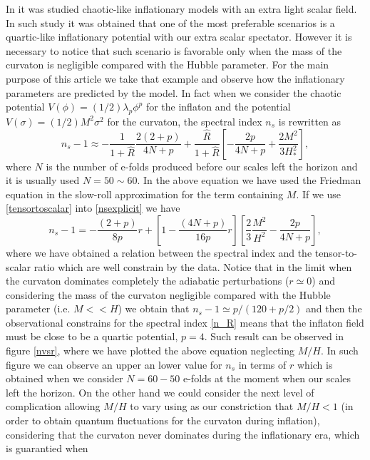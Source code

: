\documentclass[amssymb,twocolumn,prd,nofootinbib,showpacs]{revtex4-1}
\begin{document}
In \cite{curvaton15} it was studied chaotic-like inflationary models with an extra light scalar field. In such study it was obtained that one of the most preferable scenarios is a quartic-like inflationary potential with our extra scalar spectator. However it is necessary to notice that such scenario is favorable only when the mass of the curvaton is negligible compared with the Hubble parameter. For the main purpose of this article we take that example and observe how the inflationary parameters are predicted by the model. In fact when we consider the chaotic potential $V(\phi)=(1/2)\lambda_p\phi^p$ for the inflaton and the  potential $V(\sigma)= (1/2)M^2\sigma^2$ for the curvaton, the spectral index $n_s$ is rewritten as
\begin{equation}
\label{nsexplicit}
n_s-1\approx -\frac{1}{1+\hat R}\frac{2(2+p)}{4N+p}+\frac{\hat R}{1+\hat R}\left[-\frac{2p}{4N+p}+\frac{2M^2}{3H_*^2}\right],
\end{equation}
where  $N$ is the number of e-folds produced before our scales left the horizon and it is usually used $N=50\sim 60$. In the above equation we have used the Friedman equation in the slow-roll approximation for the term containing $M$. If we use \eqref{tensortoscalar} into \eqref{nsexplicit} we have 
\begin{equation}
n_s-1=-\frac{(2+p)}{8p}r+\left[1-\frac{(4N+p)}{16p}r\right]\left[\frac{2}{3}\frac{M^2}{H^2}-\frac{2p}{4N+p}\right],
\end{equation}
where we have obtained a relation between the spectral index and the tensor-to-scalar ratio which are well constrain by the data. Notice that in the limit when the curvaton dominates completely the adiabatic perturbations ($r\simeq 0$) and considering the mass of the curvaton negligible compared with the Hubble parameter (i.e. $M<<H$) we obtain that $n_s-1\simeq p/(120+p/2)$ and then the observational constrains for the spectral index \eqref{n_R} means that the inflaton field must be close to be a quartic potential, $p=4$. Such result can be observed in figure \ref{nvsr}, where we have plotted the above equation neglecting $M/H$. In such figure we can observe an upper an lower value for $n_s$ in terms of $r$ which is obtained when we consider $N=60-50$ e-folds at the moment when our scales left the horizon. On the other hand we could consider the next level of complication allowing $M/H$ to vary using as our constriction that $M/H<1$ (in order to obtain quantum fluctuations for the curvaton during inflation), considering that the curvaton never dominates during the inflationary era, which is guarantied when
\end{document}

